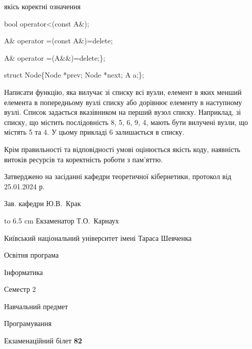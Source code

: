 \documentclass[12pt, ukrainian]{article}
\begin{document}
{\quad  якісь коректні означення 

\quad  bool operator<(const A\&); 

\quad A\& operator =(const A\&)=delete; 

\quad  A\& operator =(A\&\&)=delete;\};

struct Node\{Node *prev; Node *next; A a;\};

Написати функцію, яка вилучає зі списку всі вузли, елемент в яких менший елемента в попередньому вузлі списку або дорівнює елементу в наступному вузлі. Список задається вказівником на перший вузол списку. Наприклад, зі списку, що містить послідовність 8, 5, 6, 9, 4, мають бути вилучені вузли, що містять 5 та 4. У цьому прикладі 6 залишається в списку.

Крім правильності та відповідності умові оцінюється якість коду, наявність витоків ресурсів та коректність роботи з пам'яттю. 

}
{\smallskip\smallskip \begin {scriptsize} Затверджено на засіданні кафедри теоретичної кібернетики, протокол   від   25.01.2024 р.\par\smallskip\smallskip\smallskip\smallskip
{\parbox {6.5 cm} {Зав. кафедри \dotfill Ю.В.~Крак}}\hspace {0.7cm} {\hbox to 6.5 cm { Екзаменатор \dotfill Т.О.~Карнаух}} \end{scriptsize}}
\newpage
{{\begin {scriptsize}\par
{ \center  Київський національний університет імені Тараса Шевченка \par}
{\parbox {5 cm}{Освітня програма \hfill}{\parbox {7 cm}{Інформатика\hfill}}\parbox {6 cm}{\hfill Семестр 2}}\par
{\parbox {5 cm} {Навчальний предмет \hfill}\parbox {7 cm}{Програмування \hfill}\parbox {6cm}{\hfill}\par}\vspace{-15pt} \end{scriptsize}}{\center Екзаменаційний білет \No \textbf { 82 }\par}}
\end{document}
